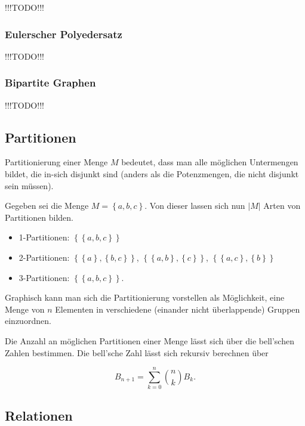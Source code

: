 \documentclass{scrartcl}
\newcommand{\TODO}{%
{\Huge\textcolor{HeavyRed}{\danger !!!TODO!!! \danger}}%
}
\begin{document}
\TODO

\subsubsection{Eulerscher Polyedersatz}

\TODO

\subsubsection{Bipartite Graphen}

\TODO

\subsection{Partitionen}

Partitionierung einer Menge $M$ bedeutet, dass man alle möglichen Untermengen
bildet, die in-sich disjunkt sind (anders als die Potenzmengen, die nicht
disjunkt sein müssen).

Gegeben sei die Menge $M = \left\{a, b, c\right\}$. Von dieser lassen sich nun $|M|$ Arten von Partitionen bilden.

\begin{itemize}
	\item 1-Partitionen: $\left\{\left\{a, b, c\right\}\right\}$

	\item 2-Partitionen: $\left\{\left\{a\right\}, \left\{b, c\right\}\right\}$,
		$\left\{\left\{a, b\right\}, \left\{ c\right\}\right\}$,
		$\left\{\left\{a, c\right\}, \left\{b\right\}\right\}$
	\item 3-Partitionen: $\left\{\left\{a, b, c\right\}\right\}$.
\end{itemize}

Graphisch kann man sich die Partitionierung vorstellen als Möglichkeit, eine Menge
von $n$ Elementen in verschiedene (einander nicht überlappende) Gruppen einzuordnen.

Die Anzahl an möglichen Partitionen einer Menge lässt sich über die bell'schen Zahlen bestimmen. Die bell'sche Zahl lässt sich rekursiv berechnen über

\begin{equation}
	B_{n + 1} = \sum_{k = 0}^n \binom{n}{k} B_k.
\end{equation}


\subsection{Relationen}
\end{document}
